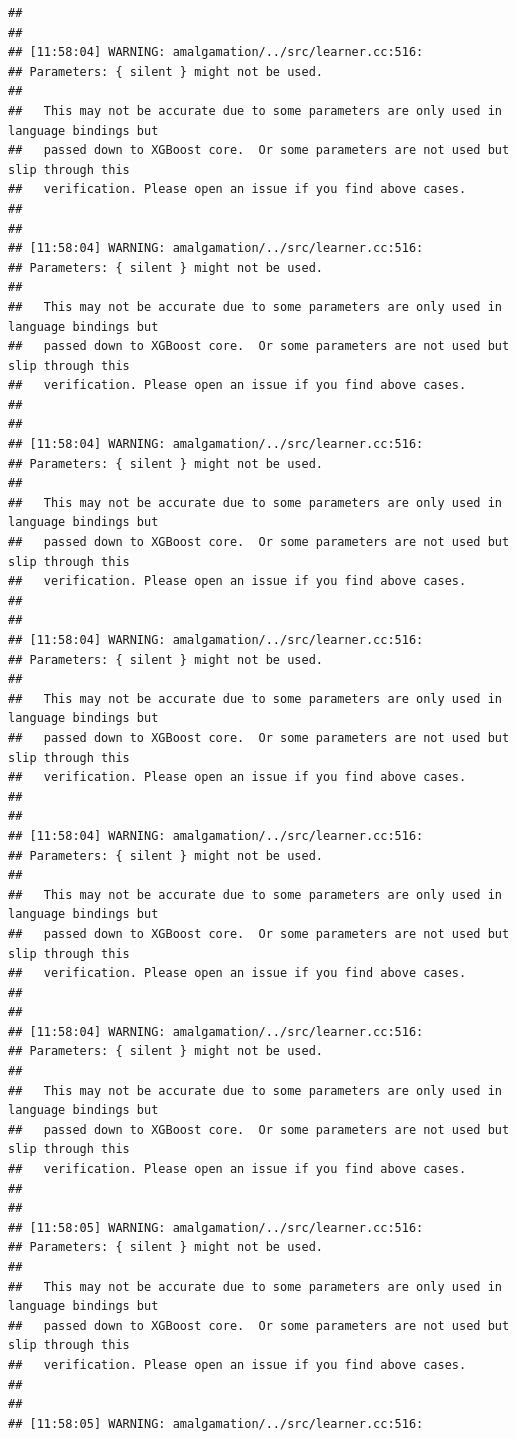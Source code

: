 \documentclass[AMS,STIX2COL]{WileyNJD-v2}\usepackage[]{graphicx}\usepackage[]{color}
\makeatletter
\newenvironment{kframe}{%
 \def\at@end@of@kframe{}%
 \ifinner\ifhmode%
  \def\at@end@of@kframe{\end{minipage}}%
  \begin{minipage}{\columnwidth}%
 \fi\fi%
 \def\FrameCommand##1{\hskip\@totalleftmargin \hskip-\fboxsep
 \colorbox{shadecolor}{##1}\hskip-\fboxsep
     \hskip-\linewidth \hskip-\@totalleftmargin \hskip\columnwidth}%
 \MakeFramed {\advance\hsize-\width
   \@totalleftmargin\z@ \linewidth\hsize
   \@setminipage}}%
 {\par\unskip\endMakeFramed%
 \at@end@of@kframe}
\newenvironment{knitrout}{}{} %
\makeatother
\begin{document}
\begin{knitrout}
\begin{kframe}
\begin{verbatim}
## 
## 
## [11:58:04] WARNING: amalgamation/../src/learner.cc:516: 
## Parameters: { silent } might not be used.
## 
##   This may not be accurate due to some parameters are only used in language bindings but
##   passed down to XGBoost core.  Or some parameters are not used but slip through this
##   verification. Please open an issue if you find above cases.
## 
## 
## [11:58:04] WARNING: amalgamation/../src/learner.cc:516: 
## Parameters: { silent } might not be used.
## 
##   This may not be accurate due to some parameters are only used in language bindings but
##   passed down to XGBoost core.  Or some parameters are not used but slip through this
##   verification. Please open an issue if you find above cases.
## 
## 
## [11:58:04] WARNING: amalgamation/../src/learner.cc:516: 
## Parameters: { silent } might not be used.
## 
##   This may not be accurate due to some parameters are only used in language bindings but
##   passed down to XGBoost core.  Or some parameters are not used but slip through this
##   verification. Please open an issue if you find above cases.
## 
## 
## [11:58:04] WARNING: amalgamation/../src/learner.cc:516: 
## Parameters: { silent } might not be used.
## 
##   This may not be accurate due to some parameters are only used in language bindings but
##   passed down to XGBoost core.  Or some parameters are not used but slip through this
##   verification. Please open an issue if you find above cases.
## 
## 
## [11:58:04] WARNING: amalgamation/../src/learner.cc:516: 
## Parameters: { silent } might not be used.
## 
##   This may not be accurate due to some parameters are only used in language bindings but
##   passed down to XGBoost core.  Or some parameters are not used but slip through this
##   verification. Please open an issue if you find above cases.
## 
## 
## [11:58:04] WARNING: amalgamation/../src/learner.cc:516: 
## Parameters: { silent } might not be used.
## 
##   This may not be accurate due to some parameters are only used in language bindings but
##   passed down to XGBoost core.  Or some parameters are not used but slip through this
##   verification. Please open an issue if you find above cases.
## 
## 
## [11:58:05] WARNING: amalgamation/../src/learner.cc:516: 
## Parameters: { silent } might not be used.
## 
##   This may not be accurate due to some parameters are only used in language bindings but
##   passed down to XGBoost core.  Or some parameters are not used but slip through this
##   verification. Please open an issue if you find above cases.
## 
## 
## [11:58:05] WARNING: amalgamation/../src/learner.cc:516: 

\end{verbatim}
\end{kframe}
\end{knitrout}
\end{document}
